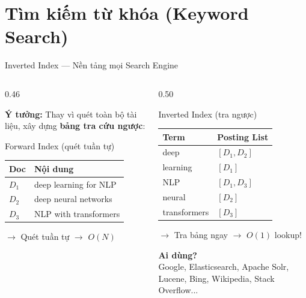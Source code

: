 \documentclass[aspectratio=169, 11pt]{beamer}
\begin{document}
\section{Tìm kiếm từ khóa (Keyword Search)}

\begin{frame}{Inverted Index --- Nền tảng mọi Search Engine}
\begin{columns}[T]
\begin{column}{0.46\textwidth}

\textbf{Ý tưởng:} Thay vì quét toàn bộ tài liệu, xây dựng \textbf{bảng tra cứu ngược}:

\vspace{0.3cm}

\begin{block}{Forward Index {\small (quét tuần tự)}}
\centering
{\small
\begin{tabular}{l|l}
\textcolor{accentTeal}{\textbf{Doc}} & \textcolor{accentTeal}{\textbf{Nội dung}} \\
\hline
$D_1$ & deep learning for NLP \\
$D_2$ & deep neural networks \\
$D_3$ & NLP with transformers \\
\end{tabular}
}

\vspace{0.15cm}
{\small\textcolor{textLight}{$\to$ Quét tuần tự $\to$ $O(N)$}}
\end{block}

\end{column}
\begin{column}{0.50\textwidth}

\begin{exampleblock}{Inverted Index {\small (tra ngược)}}
\centering
{\small
\begin{tabular}{l|l}
\textcolor{accentTeal}{\textbf{Term}} & \textcolor{accentTeal}{\textbf{Posting List}} \\
\hline
deep & $[D_1, D_2]$ \\
learning & $[D_1]$ \\
NLP & $[D_1, D_3]$ \\
neural & $[D_2]$ \\
transformers & $[D_3]$ \\
\end{tabular}
}

\vspace{0.15cm}
{\small\textcolor{accentTeal}{$\to$ Tra bảng ngay $\to$ $O(1)$ lookup!}}
\end{exampleblock}

\vspace{0.3cm}
\textbf{Ai dùng?}\\
{\small Google, Elasticsearch, Apache Solr, Lucene, Bing, Wikipedia, Stack Overflow...}

\end{column}
\end{columns}
\end{frame}
\end{document}
